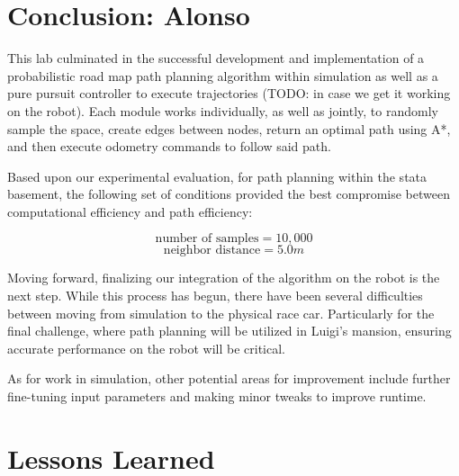\documentclass{article}
\begin{document}
\section{Conclusion: Alonso}

This lab culminated in the successful development and implementation of a probabilistic road map path planning algorithm within simulation as well as a pure pursuit controller to execute trajectories (TODO: in case we get it working on the robot). Each module works individually, as well as jointly, to randomly sample the space, create edges between nodes, return an optimal path using A*, and then execute odometry commands to follow said path.

Based upon our experimental evaluation, for path planning within the stata basement, the following set of conditions provided the best compromise between computational efficiency and path efficiency:

\begin{equation}
\text{number of samples} = 10,000
\end{equation}
\begin{equation}
\text{neighbor distance} = 5.0 m
\end{equation}

Moving forward, finalizing our integration of the algorithm on the robot is the next step. While this process has begun, there have been several difficulties between moving from simulation to the physical race car. Particularly for the final challenge, where path planning will be utilized in Luigi's mansion, ensuring accurate performance on the robot will be critical. 

As for work in simulation, other potential areas for improvement include further fine-tuning input parameters and making minor tweaks to improve runtime.


\section{Lessons Learned}
\end{document}
